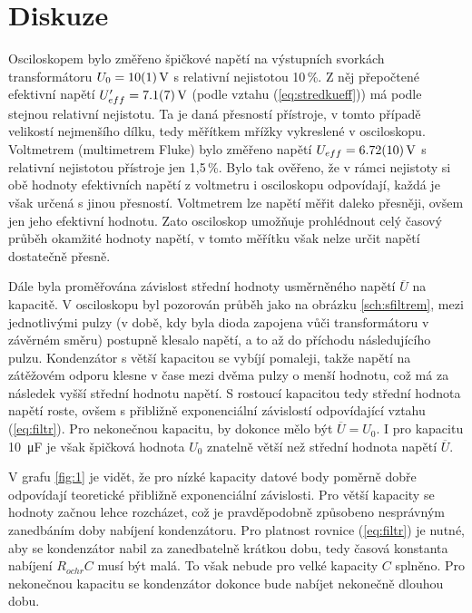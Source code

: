 \documentclass{../concepts/prepareprotokol} %
\begin{document}
\section{Diskuze}

Osciloskopem bylo změřeno špičkové napětí na výstupních svorkách transformátoru $U_0 = \qty{10\pm1}{V}$ s relativní nejistotou 10\,\%. Z něj přepočtené efektivní napětí $U'_{eff} = \qty{7.1 \pm 0.7}{V}$ (podle vztahu (\ref{eq:stredkueff})) má podle \cite{englich} stejnou relativní nejistotu. Ta je daná přesností přístroje, v tomto případě velikostí nejmenšího dílku, tedy měřítkem mřížky vykreslené v osciloskopu. Voltmetrem (multimetrem Fluke) bylo změřeno napětí $U_{eff}= \qty{6.72\pm0.10}{V}$ s relativní nejistotou přístroje jen 1,5\,\%. Bylo tak ověřeno, že v rámci nejistoty si obě hodnoty efektivních napětí z voltmetru i osciloskopu odpovídají, každá je však určená s jinou přesností. Voltmetrem lze napětí měřit daleko přesněji, ovšem jen jeho efektivní hodnotu. Zato osciloskop umožňuje prohlédnout celý časový průběh okamžité hodnoty napětí, v tomto měřítku však nelze určit napětí dostatečně přesně.

Dále byla proměřována závislost střední hodnoty usměrněného napětí $\overline{U}$ na kapacitě. V osciloskopu byl pozorován průběh jako na obrázku \ref{sch:sfiltrem}, mezi jednotlivými pulzy (v době, kdy byla dioda zapojena vůči transformátoru v závěrném směru) postupně klesalo napětí, a to až do příchodu následujícího pulzu. Kondenzátor s větší kapacitou se vybíjí pomaleji, takže napětí na zátěžovém odporu klesne v čase mezi dvěma pulzy o menší hodnotu, což má za následek vyšší střední hodnotu napětí. S rostoucí kapacitou tedy střední hodnota napětí roste, ovšem s přibližně exponenciální závislostí odpovídající vztahu (\ref{eq:filtr}). Pro nekonečnou kapacitu, by dokonce mělo být $\overline{U} = U_0$. I pro kapacitu \qty{10}{\micro\farad} je však špičková hodnota $U_0$ znatelně větší než střední hodnota napětí $\overline{U}$.

V grafu \ref{fig:1} je vidět, že pro nízké kapacity datové body poměrně dobře odpovídají teoretické přibližně exponenciální závislosti. Pro větší kapacity se hodnoty začnou lehce rozcházet, což je pravděpodobně způsobeno nesprávným zanedbáním doby nabíjení kondenzátoru. Pro platnost rovnice (\ref{eq:filtr}) je nutné, aby se kondenzátor nabil za zanedbatelně krátkou dobu, tedy časová konstanta nabíjení $R_{ochr} C$ musí být malá. To však nebude pro velké kapacity $C$ splněno. Pro nekonečnou kapacitu se kondenzátor dokonce bude nabíjet nekonečně dlouhou dobu.
\end{document}
